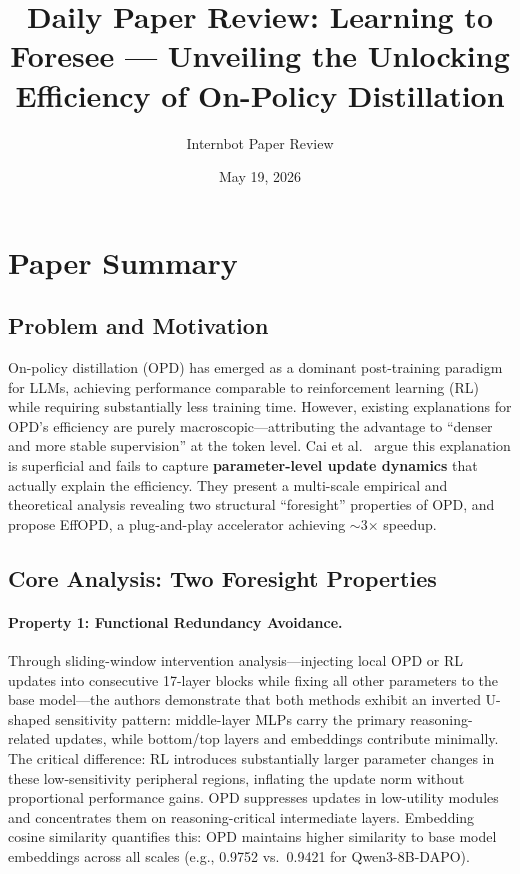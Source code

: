 \documentclass[11pt,a4paper]{article}
\title{Daily Paper Review: Learning to Foresee --- Unveiling the Unlocking Efficiency of On-Policy Distillation}
\author{Internbot Paper Review}
\date{May 19, 2026}
\begin{document}
\maketitle

\section{Paper Summary}

\subsection{Problem and Motivation}

On-policy distillation (OPD) has emerged as a dominant post-training paradigm for LLMs, achieving performance comparable to reinforcement learning (RL) while requiring substantially less training time. However, existing explanations for OPD's efficiency are purely macroscopic---attributing the advantage to ``denser and more stable supervision'' at the token level. Cai et al.~\cite{foresee} argue this explanation is superficial and fails to capture \textbf{parameter-level update dynamics} that actually explain the efficiency. They present a multi-scale empirical and theoretical analysis revealing two structural ``foresight'' properties of OPD, and propose EffOPD, a plug-and-play accelerator achieving ${\sim}$3$\times$ speedup.

\subsection{Core Analysis: Two Foresight Properties}

\paragraph{Property 1: Functional Redundancy Avoidance.}
Through sliding-window intervention analysis---injecting local OPD or RL updates into consecutive 17-layer blocks while fixing all other parameters to the base model---the authors demonstrate that both methods exhibit an inverted U-shaped sensitivity pattern: middle-layer MLPs carry the primary reasoning-related updates, while bottom/top layers and embeddings contribute minimally. The critical difference: RL introduces substantially larger parameter changes in these low-sensitivity peripheral regions, inflating the update norm without proportional performance gains. OPD suppresses updates in low-utility modules and concentrates them on reasoning-critical intermediate layers. Embedding cosine similarity quantifies this: OPD maintains higher similarity to base model embeddings across all scales (e.g., 0.9752 vs.\ 0.9421 for Qwen3-8B-DAPO).
\end{document}
